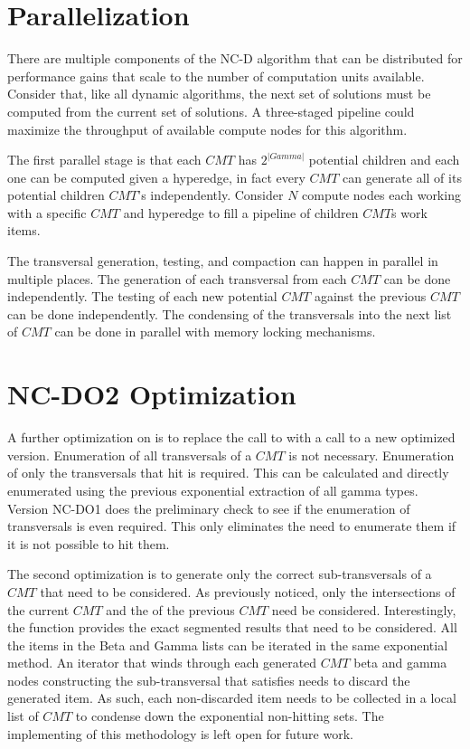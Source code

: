 \section{Parallelization}

There are multiple components of the NC-D algorithm that can be distributed for performance gains that scale to the number of computation units available. Consider that, like all dynamic algorithms, the next set of solutions must be computed from the current set of solutions. A three-staged pipeline could maximize the throughput of available compute nodes for this algorithm. 

The first parallel stage is that each $CMT$ has $2^{|Gamma|}$ potential children and each one can be computed given a hyperedge, in fact every $CMT$ can generate all of its potential children $CMT$'s independently. Consider $N$ compute nodes each working with a specific $CMT$ and hyperedge to fill a pipeline of children $CMT$s work items. 


The transversal generation, testing, and compaction can happen in parallel in multiple places. The generation of each transversal from each $CMT$ can be done independently. The testing of each new potential $CMT$ against the previous $CMT$ can be done independently. The condensing of the transversals into the next list of $CMT$ can be done in parallel with memory locking mechanisms.

\section{NC-DO2 Optimization}

A further optimization on  is to replace the call to  with a call to a new optimized version. Enumeration of all transversals of a $CMT$ is not necessary. Enumeration of only the transversals that hit is required.  This can be calculated and directly enumerated using the previous exponential extraction of all gamma types. 
Version NC-DO1 does the preliminary check to see if the enumeration of transversals is even required. This only eliminates the need to enumerate them if it is not possible to hit them. 

The second optimization is to generate only the correct sub-transversals of a $CMT$ that need to be considered. As previously noticed, only the intersections of the current $CMT$ and the  of the previous $CMT$ need be considered. Interestingly, the  function provides the exact segmented results that need to be considered. All the items in the Beta and Gamma lists can be iterated in the same exponential method. An iterator that winds through each generated $CMT$ beta and gamma nodes constructing the sub-transversal that satisfies  needs to discard the generated item. As such, each non-discarded item needs to be collected in a local list of $CMT$ to condense down the exponential non-hitting sets. The implementing of this methodology is left open for future work. 


